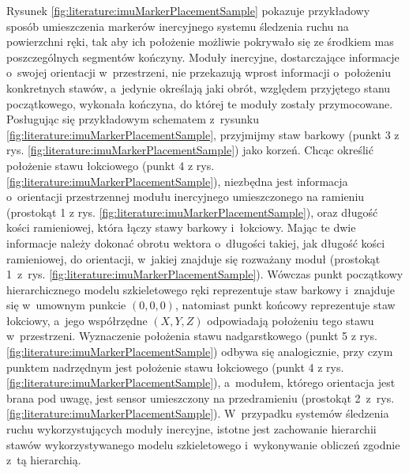 Rysunek \ref{fig:literature:imuMarkerPlacementSample} pokazuje przykładowy sposób umieszczenia markerów inercyjnego systemu śledzenia ruchu na powierzchni ręki, tak aby ich położenie możliwie pokrywało się ze środkiem mas poszczególnych segmentów kończyny. Moduły inercyjne, dostarczające informacje o~swojej orientacji w~przestrzeni, nie przekazują wprost informacji o~położeniu konkretnych stawów, a~jedynie określają jaki obrót, względem przyjętego stanu początkowego, wykonała kończyna, do której te moduły zostały przymocowane. Posługując się przykładowym schematem z~rysunku \ref{fig:literature:imuMarkerPlacementSample}, przyjmijmy staw barkowy (punkt 3 z rys. \ref{fig:literature:imuMarkerPlacementSample}) jako korzeń. Chcąc określić położenie stawu łokciowego (punkt 4 z rys. \ref{fig:literature:imuMarkerPlacementSample}), niezbędna jest informacja o~orientacji przestrzennej modułu inercyjnego umieszczonego na ramieniu (prostokąt 1 z rys. \ref{fig:literature:imuMarkerPlacementSample}), oraz długość kości ramieniowej, która łączy stawy barkowy i~łokciowy. Mając te dwie informacje należy dokonać obrotu wektora o~długości takiej, jak długość kości ramieniowej, do orientacji, w~jakiej znajduje się rozważany moduł (prostokąt 1~z~rys. \ref{fig:literature:imuMarkerPlacementSample}). Wówczas punkt początkowy hierarchicznego modelu szkieletowego ręki reprezentuje staw barkowy i~znajduje się w~umownym punkcie $(0 , 0 , 0)$, natomiast punkt końcowy reprezentuje staw łokciowy, a~jego współrzędne $(X , Y , Z)$ odpowiadają położeniu tego stawu w~przestrzeni. Wyznaczenie położenia stawu nadgarstkowego (punkt 5 z rys. \ref{fig:literature:imuMarkerPlacementSample}) odbywa się analogicznie, przy czym punktem nadrzędnym jest położenie stawu łokciowego (punkt 4 z rys. \ref{fig:literature:imuMarkerPlacementSample}), a~modułem, którego orientacja jest brana pod uwagę, jest sensor umieszczony na przedramieniu (prostokąt 2~z~rys. \ref{fig:literature:imuMarkerPlacementSample}). W~przypadku systemów śledzenia ruchu wykorzystujących moduły inercyjne, istotne jest zachowanie hierarchii stawów wykorzystywanego modelu szkieletowego i~wykonywanie obliczeń zgodnie z~tą hierarchią.
																							
